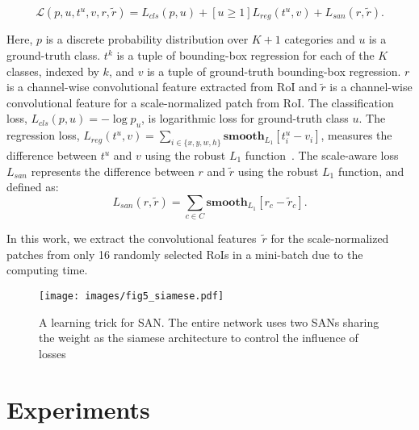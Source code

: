 \documentclass[runningheads]{llncs}
\begin{document}
\begin{equation}
\mathcal{L}(p,u,t^u,v,r,\widetilde{r}) =
L_{cls} (p,u)
+ [u \geq 1] L_{reg}(t^u,v)
+ L_{san}(r,\widetilde{r}).
\end{equation}

Here, $p$ is a discrete probability distribution over $K+1$ categories and $u$ is a ground-truth class.
$t^k$ is a tuple of bounding-box regression for each of the $K$ classes, indexed by $k$, and $v$ is a tuple of ground-truth bounding-box regression.
$r$ is a channel-wise convolutional feature extracted from RoI and $\widetilde{r}$ is a channel-wise convolutional feature for a scale-normalized patch from RoI.
The classification loss,
$L_{cls} (p,u)=-\log p_u$,
is logarithmic loss for ground-truth class $u$.
The regression loss,
$L_{reg}(t^u,v)=\sum _{i \in \{ x,y,w,h \} } {\mathbf{smooth}_{L_1}} \left[ t_i^u-v_i \right]$,
measures the difference between $t^u$ and $v$ using the robust $L_1$ function~\cite{girshick2015fast}.
The scale-aware loss $L_{san}$ represents the difference between $r$ and $\widetilde{r}$ using the robust $L_1$ function, and defined as:
\begin{equation}
L_{san}(r,\widetilde{r}) = \sum _ {c \in C} {\mathbf{smooth}_{L_1}} \left[ r_c-\widetilde{r}_c \right].
\end{equation}

In this work, we extract the convolutional features~$\widetilde{r}$ for the scale-normalized patches from only 16 randomly selected RoIs in a mini-batch due to the computing time.

\begin{figure}[t]
	\texttt{[image: images/fig5\_siamese.pdf]}
	\caption{A learning trick for SAN.
		The entire network uses two SANs sharing the weight as the siamese architecture to control the influence of losses
	}
	\centering
	\label{fig:SIAMESE}
\end{figure}

\section{Experiments}
\end{document}

